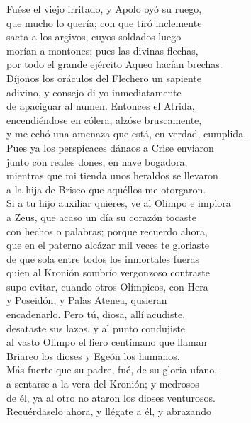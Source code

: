 Fuése el viejo irritado, y Apolo oyó su ruego,\\
que mucho lo quería; con que tiró inclemente\\
saeta a los argivos, cuyos soldados luego\\
morían a montones; pues las divinas flechas,\\
por todo el grande ejército Aqueo hacían brechas.\\
Díjonos los oráculos del Flechero un sapiente\\
adivino, y consejo di yo inmediatamente\\
de apaciguar al numen. Entonces el Atrida,\\
encendiéndose en cólera, alzóse bruscamente,\\
y me echó una amenaza que está, en verdad, cumplida.\\
Pues ya los perspicaces dánaos a Crise enviaron\\
junto con reales dones, en nave bogadora;\\
mientras que mi tienda unos heraldos se llevaron\\
a la hija de Briseo que aquéllos me otorgaron.\\
Si a tu hijo auxiliar quieres, ve al Olimpo e implora\\
a Zeus, que acaso un día su corazón tocaste\\
con hechos o palabras; porque recuerdo ahora,\\
que en el paterno alcázar mil veces te gloriaste\\
de que sola entre todos los inmortales fueras\\
quien al Kronión sombrío vergonzoso contraste\\
supo evitar, cuando otros Olímpicos, con Hera\\
y Poseidón, y Palas Atenea, qusieran\\
encadenarlo. Pero tú, diosa, allí acudiste,\\
desataste sus lazos, y al punto condujiste\\
al vasto Olimpo el fiero centímano que llaman\\
Briareo los dioses y Egeón los humanos.\\
Más fuerte que su padre, fué, de su gloria ufano,\\
a sentarse a la vera del Kronión; y medrosos\\
de él, ya al otro no ataron los dioses venturosos.\\
Recuérdaselo ahora, y llégate a él, y abrazando\\

